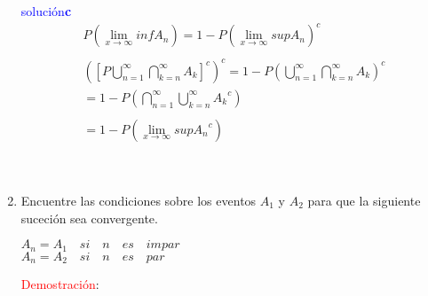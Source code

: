 \documentclass[a4paper, 12pt]{article}
\begin{document}
\begin{enumerate}
\textcolor{blue}{ soluci\'on\quad\textbf{c}}\\
\begin{equation*}
\begin{aligned}
P\left(\displaystyle\lim_{x \rightarrow \infty}inf A_n\right)=1-P\left(\displaystyle\lim_{x \rightarrow \infty}sup A_n\right)^c\\\\
\left([P\displaystyle\bigcup_{n=1}^{\infty}\bigcap_{k=n}^{\infty}{A_k}]^c\right)^c
=1-P\left(\displaystyle\bigcup_{n=1}^{\infty}\bigcap_{k=n}^{\infty}{A_k}\right)^c\\
=1-P\left(\displaystyle\bigcap_{n=1}^{\infty}\bigcup_{k=n}^{\infty}{A_k}^c\right)\\\\
=1-P\left(\displaystyle\lim_{x \rightarrow \infty}sup{A_n}^c\right)
\end{aligned}
\end{equation*}\\\\
\item Encuentre las condiciones sobre los eventos $A_1$ y $A_2$ para que la siguiente suceci\'on sea convergente.

\begin{center}
 $A_n= A_1  \quad  si \quad n \quad  es \quad impar$\\
$A_n= A_2  \quad si \quad n \quad es \quad par$\\
 
\end{center}

\textcolor{red}{Demostraci\'on}:


 
\end{enumerate}    
\end{document}
